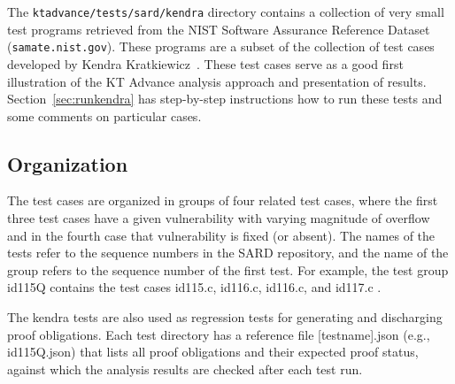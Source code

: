\documentclass[11pt]{article}
\begin{document}
The {\tt ktadvance/tests/sard/kendra} directory contains a collection of very small test
programs retrieved from the NIST Software Assurance Reference Dataset ({\tt samate.nist.gov}).
These programs are a subset of the collection of test cases developed by 
Kendra Kratkiewicz~\cite{Kratkiewicz/05/Using}. These test cases serve as a good first 
illustration of
the KT Advance analysis approach and presentation of results. 
Section~\ref{sec:runkendra} has step-by-step instructions how to run these tests
and some comments on particular cases.

\subsection{Organization}
The test cases are organized in groups of four related test cases, where the first 
three test cases have a given vulnerability with varying magnitude of overflow and 
in the fourth case that vulnerability is fixed (or absent). The names of the tests 
refer to the sequence numbers in the SARD repository, and the name of the group 
refers to the sequence number of the first test. For example, the test group id115Q 
contains the test cases id115.c, id116.c, id116.c, and id117.c . 

The kendra tests are also used as regression tests for generating and discharging proof 
obligations.
Each test directory has a reference file [testname].json (e.g., id115Q.json) that lists 
all proof obligations
and their expected proof status, against which the analysis results are checked after
each test run.
\end{document}
